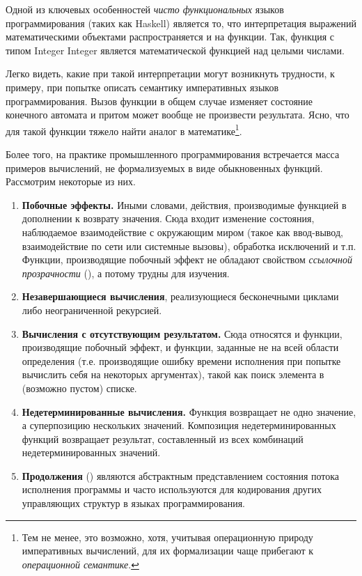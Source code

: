 Одной из ключевых особенностей \emph{чисто функциональных} языков программирования (таких как Haskell\cite{hudak1992report}) является то, что интерпретация выражений математическими объектами распространяется и на функции. Так, функция с типом \<Integer \to Integer\> является математической функцией над целыми числами.

Легко видеть, какие при такой интерпретации могут возникнуть трудности, к примеру, при попытке описать семантику императивных языков программирования. Вызов функции в общем случае изменяет состояние конечного автомата и притом может вообще не произвести результата. Ясно, что для такой функции тяжело найти аналог в математике\footnote{Тем не менее, это возможно, хотя, учитывая операционную природу императивных вычислений, для их формализации чаще прибегают к \emph{операционной семантике}.}.

Более того, на практике промышленного программирования встречается масса примеров вычислений, не формализуемых в виде обыкновенных функций. Рассмотрим некоторые из них.

\begin{enumerate}
  \item \textbf{Побочные эффекты.} Иными словами, действия, производимые функцией в дополнении к возврату значения. Сюда входит изменение состояния, наблюдаемое взаимодействие с окружающим миром (такое как ввод-вывод, взаимодействие по сети или системные вызовы), обработка исключений и т.п. Функции, производящие побочный эффект не обладают свойством \emph{ссылочной прозрачности}\cite{sondergaard1990referential} (), а потому трудны для изучения.
  \item \textbf{Незавершающиеся вычисления}, реализующиеся бесконечными циклами либо неограниченной рекурсией.
  \item \textbf{Вычисления с отсутствующим результатом.} Сюда относятся и функции, производящие побочный эффект, и функции, заданные не на всей области определения (т.е. производящие ошибку времени исполнения при попытке вычислить себя на некоторых аргументах), такой как поиск элемента в (возможно пустом) списке.
  \item \textbf{Недетерминированные вычисления.} Функция возвращает не одно значение, а суперпозицию нескольких значений. Композиция недетерминированных функций возвращает результат, составленный из всех комбинаций недетерминированных значений.
  \item \textbf{Продолжения} () являются абстрактным представлением состояния потока исполнения программы и часто используются для кодирования других управляющих структур в языках программирования.
\end{enumerate}


